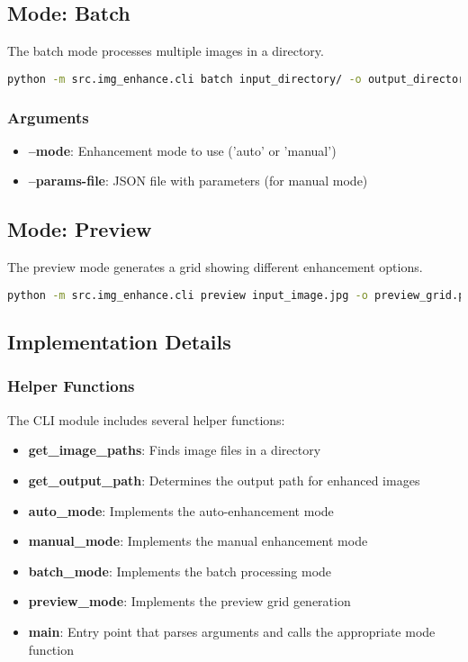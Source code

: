 \subsection{Mode: Batch}

The batch mode processes multiple images in a directory.

\begin{lstlisting}[language=bash]
python -m src.img_enhance.cli batch input_directory/ -o output_directory/ --mode auto
\end{lstlisting}

\subsubsection{Arguments}
\begin{itemize}
  \item \textbf{--mode}: Enhancement mode to use ('auto' or 'manual')
  \item \textbf{--params-file}: JSON file with parameters (for manual mode)
\end{itemize}

\subsection{Mode: Preview}

The preview mode generates a grid showing different enhancement options.

\begin{lstlisting}[language=bash]
python -m src.img_enhance.cli preview input_image.jpg -o preview_grid.png
\end{lstlisting}

\subsection{Implementation Details}

\subsubsection{Helper Functions}

The CLI module includes several helper functions:

\begin{itemize}
  \item \textbf{get\_image\_paths}: Finds image files in a directory
  \item \textbf{get\_output\_path}: Determines the output path for enhanced images
  \item \textbf{auto\_mode}: Implements the auto-enhancement mode
  \item \textbf{manual\_mode}: Implements the manual enhancement mode
  \item \textbf{batch\_mode}: Implements the batch processing mode
  \item \textbf{preview\_mode}: Implements the preview grid generation
  \item \textbf{main}: Entry point that parses arguments and calls the appropriate mode function
\end{itemize}

